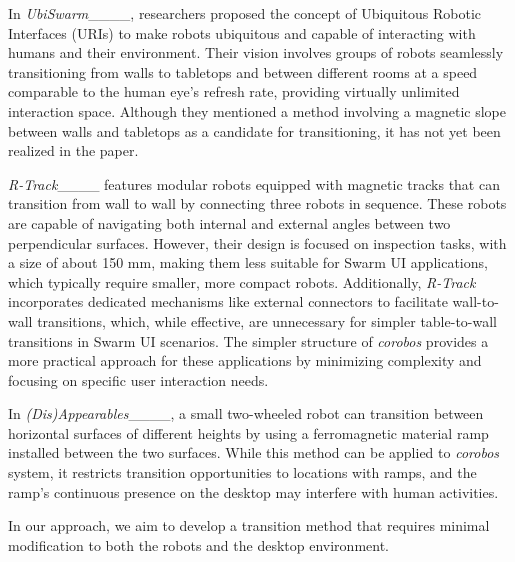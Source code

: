 In \textit{UbiSwarm}____, researchers proposed the concept of Ubiquitous Robotic Interfaces (URIs) to make robots ubiquitous and capable of interacting with humans and their environment.
Their vision involves groups of robots seamlessly transitioning from walls to tabletops and between different rooms at a speed comparable to the human eye’s refresh rate, providing virtually unlimited interaction space.
Although they mentioned a method involving a magnetic slope between walls and tabletops as a candidate for transitioning, it has not yet been realized in the paper.

\textit{R-Track}____ features modular robots equipped with magnetic tracks that can transition from wall to wall by connecting three robots in sequence.
These robots are capable of navigating both internal and external angles between two perpendicular surfaces.
However, their design is focused on inspection tasks, with a size of about 150 mm, making them less suitable for Swarm UI applications, which typically require smaller, more compact robots.
Additionally, \textit{R-Track} incorporates dedicated mechanisms like external connectors to facilitate wall-to-wall transitions, which, while effective, are unnecessary for simpler table-to-wall transitions in Swarm UI scenarios.
The simpler structure of \textit{corobos} provides a more practical approach for these applications by minimizing complexity and focusing on specific user interaction needs.

In \textit{(Dis)Appearables}____, a small two-wheeled robot can transition between horizontal surfaces of different heights by using a ferromagnetic material ramp installed between the two surfaces.
While this method can be applied to \textit{corobos} system, it restricts transition opportunities to locations with ramps, and the ramp’s continuous presence on the desktop may interfere with human activities.

In our approach, we aim to develop a transition method that requires minimal modification to both the robots and the desktop environment.
